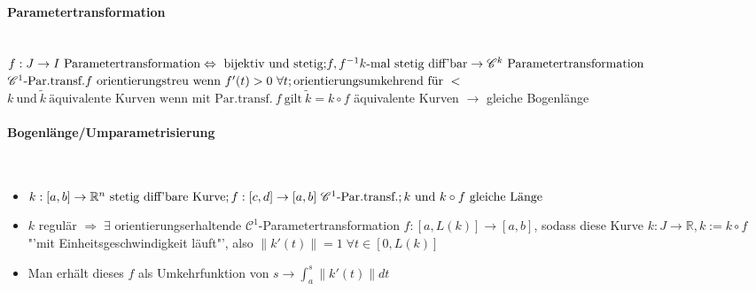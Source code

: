 \documentclass[paper=a3,paper=landscape, fontsize=9pt,DIV=25]{scrartcl}
\newcommand{\real}{{\mathbb{R}}}
\begin{document}
\begin{multicols*}{4}
  \paragraph{Parametertransformation}\hspace{0pt} \\
  $ f: J \rightarrow I \ \text{Parametertransformation} \Leftrightarrow \ \text{bijektiv und stetig;}\\  f, f^{-1} k\text{-mal stetig diff'bar} \rightarrow \mathscr{C}^k \ \text{Parametertransformation}$\\
  $\mathscr{C}^1 \text{-Par.transf.} f \ \text{orientierungstreu wenn} \ f'(t) > 0 \ \forall t; \\ \text{orientierungsumkehrend für} \ <$\\
  $ k \ \text{und}\ \tilde{k} \ \text{äquivalente Kurven wenn mit Par.transf.}\ f \ \text{gilt}\ \tilde{k} = k \circ f$ äquivalente Kurven $\rightarrow$ gleiche Bogenlänge\\


  \paragraph{Bogenlänge/Umparametrisierung}\hspace{0pt} \\
\begin{itemize}
	\item   $k: [a,b] \rightarrow \real^n \ \text{stetig diff'bare Kurve};\\ f:[c,d] \rightarrow [a,b] \ \mathscr{C}^1\text{-Par.transf.}; k \ \text{und}\ k \circ f \ \text{gleiche Länge} $
	\item $k$ regulär $\Rightarrow\;\exists$ orientierungserhaltende $\mathscr{C}^1$-Parametertransformation $f : [a,L(k)] \rightarrow [a,b]$, sodass diese Kurve $k: J \rightarrow \real, k := k \circ f$ "'mit Einheitsgeschwindigkeit läuft"', also $\lVert k'(t) \rVert = 1 \; \forall t \in [0,L(k)]$
	\item Man erhält dieses $f$ als Umkehrfunktion von $s \rightarrow \int_{a}^{s} \lVert k'(t)\rVert dt$
\end{itemize}


\end{multicols*}
\end{document}
